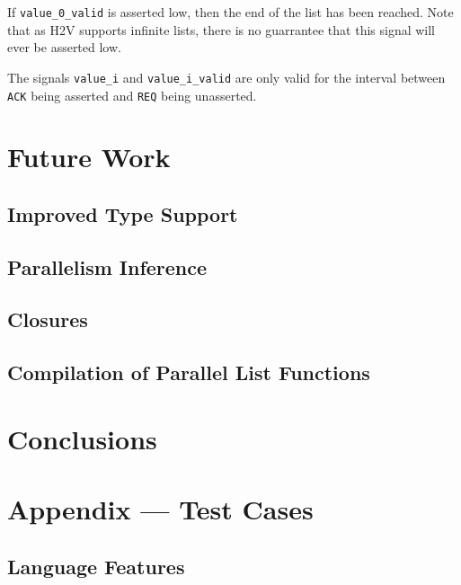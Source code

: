 \documentclass[english,onecolumn]{scrartcl}
\begin{document}
If \texttt{value\_0\_valid} is asserted low, then the end of the list has been reached. Note that as H2V supports infinite lists,
there is no guarrantee that this signal will ever be asserted low.

The signals \texttt{value\_i} and \texttt{value\_i\_valid} are only valid
for the interval between \texttt{ACK} being asserted and \texttt{REQ} being unasserted.


\section{Future Work}

\subsection{Improved Type Support}

\subsection{Parallelism Inference}

\subsection{Closures}

\subsection{Compilation of Parallel List Functions}
\label{sec:parListComp}

\section{Conclusions}


\pagebreak{}
\appendix
\section{Appendix --- Test Cases}
\subsection{Language Features}
\label{sec:testLangFeat}





\end{document}

